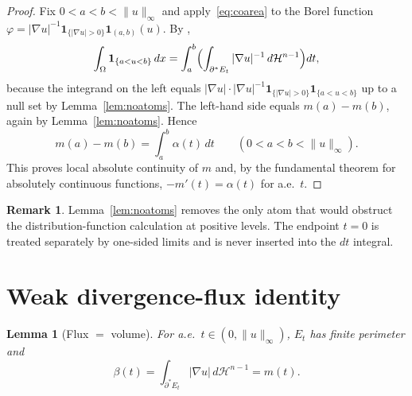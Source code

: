 \documentclass[11pt]{article}
\newtheorem{lemma}[theorem]{Lemma}
\theoremstyle{definition}
\newtheorem{remark}[theorem]{Remark}
\newcommand{\Om}{\Omega}
\begin{document}
\begin{proof}
Fix $0<a<b<\|u\|_{\infty}$ and apply~\eqref{eq:coarea}
to the Borel function $\varphi=|\nabla u|^{-1}
\mathbf 1_{\{|\nabla u|>0\}}\mathbf 1_{(a,b)}(u)$. By
\cite[Thm.~13.1]{Maggi2012},
\[
   \int_{\Om}\mathbf 1_{\{a<u<b\}}\,dx
   =\int_{a}^{b}
     \Bigl(\int_{\partial^{*}E_{t}}|\nabla u|^{-1}\,d\mathcal H^{n-1}
     \Bigr)dt,
\]
because the integrand on the left equals
$|\nabla u|\cdot|\nabla u|^{-1}\mathbf 1_{\{|\nabla u|>0\}}
\mathbf 1_{\{a<u<b\}}$ up to a null set by Lemma~\ref{lem:noatoms}.  The
left-hand side equals $m(a)-m(b)$, again by Lemma~\ref{lem:noatoms}.  Hence
\[
   m(a)-m(b)=\int_a^b\alpha(t)\,dt
   \qquad(0<a<b<\|u\|_{\infty}).
\]
This proves local absolute continuity of $m$ and, by the fundamental
theorem for absolutely continuous functions, $-m'(t)=\alpha(t)$ for a.e.\
$t$.
\end{proof}

\begin{remark}\label{rem:plateaus}
Lemma~\ref{lem:noatoms} removes the only atom that would obstruct the
distribution-function calculation at positive levels.  The endpoint
$t=0$ is treated separately by one-sided limits and is never inserted
into the $dt$ integral.
\end{remark}

\section{Weak divergence-flux identity}\label{sec:flux}

\begin{lemma}[Flux $=$ volume]\label{lem:flux}
For a.e.\ $t\in(0,\|u\|_{\infty})$, $E_{t}$ has finite perimeter and
\begin{equation}\label{eq:L2}
   \beta(t)=
   \int_{\partial^{*}E_{t}}|\nabla u|\,d\mathcal H^{n-1}
   =m(t).
\end{equation}
\end{lemma}
\end{document}
